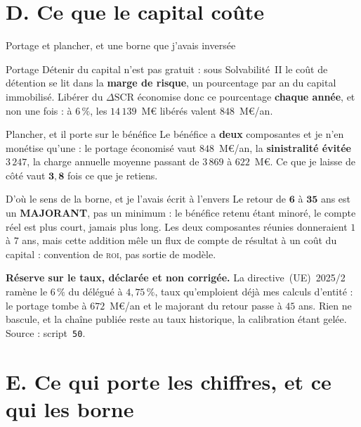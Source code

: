 \documentclass[11pt]{beamer}
\begin{document}
\section*{D. Ce que le capital coûte}

\begin{frame}{Portage et plancher, et une borne que j'avais inversée}
\scriptsize
\begin{block}{Portage}
Détenir du capital n'est pas gratuit : sous Solvabilité~II le coût de détention se lit dans la
\textbf{marge de risque}, un pourcentage par an du capital immobilisé. Libérer du
$\Delta\mathrm{SCR}$ économise donc ce pourcentage \textbf{chaque année}, et non une fois : à
$6\,\%$, les $14\,139$~M\euro{} libérés valent $848$~M\euro/an.
\end{block}
\vspace{-1mm}
\begin{block}{Plancher, et il porte sur le bénéfice}
Le bénéfice a \textbf{deux} composantes et je n'en monétise qu'une : le portage économisé vaut
$848$~M\euro/an, la \textbf{sinistralité évitée} $3\,247$, la charge annuelle moyenne passant de
$3\,869$ à $622$~M\euro. Ce que je laisse de côté vaut $\mathbf{3{,}8}$ fois ce que je retiens.
\end{block}
\vspace{-1mm}
\begin{block}{D'où le sens de la borne, et je l'avais écrit à l'envers}
Le retour de $\mathbf{6}$ à $\mathbf{35}$ ans est un \textbf{MAJORANT}, pas un minimum : le
bénéfice retenu étant minoré, le compte réel est plus court, jamais plus long. Les deux
composantes réunies donneraient $1$ à $7$ ans, mais cette addition mêle un flux de compte de
résultat à un coût du capital : convention de \textsc{roi}, pas sortie de modèle.
\end{block}
\vspace{-1mm}
{\scriptsize \textbf{Réserve sur le taux, déclarée et non corrigée.} La directive~(UE)~2025/2
ramène le $6\,\%$ du délégué à $4{,}75\,\%$, taux qu'emploient déjà mes calculs d'entité : le
portage tombe à $672$~M\euro/an et le majorant du retour passe à $45$ ans. Rien ne bascule, et la
chaîne publiée reste au taux historique, la calibration étant gelée. Source : script~\texttt{50}.}
\end{frame}


\section*{E. Ce qui porte les chiffres, et ce qui les borne}
\end{document}
